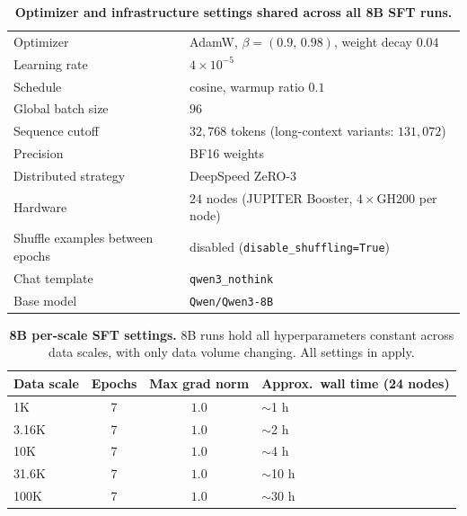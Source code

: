 \begin{table}[!htbp]
\centering
\begin{tabular}{ll}
\toprule
Optimizer                          & AdamW, $\beta = (0.9,\,0.98)$, weight decay $0.04$ \\
Learning rate                      & $4\times10^{-5}$ \\
Schedule                           & cosine, warmup ratio $0.1$ \\
Global batch size                  & $96$ \\
Sequence cutoff                    & $32{,}768$ tokens (long-context variants: $131{,}072$) \\
Precision                          & BF16 weights \\
Distributed strategy               & DeepSpeed ZeRO-3 \\
Hardware                           & $24$ nodes (JUPITER Booster, $4\times$GH200 per node) \\
Shuffle examples between epochs    & disabled (\texttt{disable\_shuffling=True}) \\
Chat template                      & \texttt{qwen3\_nothink} \\
Base model                         & \texttt{Qwen/Qwen3-8B} \\
\bottomrule
\end{tabular}
\vspace{6pt}
\caption{\textbf{Optimizer and infrastructure settings shared across all 8B SFT runs.}}
\label{tab:sft_hp_common_8b}
\end{table}



\begin{table}[!htbp]
\centering
\begin{tabular}{lccl}
\toprule
Data scale & Epochs & Max grad norm & Approx.\ wall time (24 nodes) \\
\midrule
1K    & 7 & $1.0$ & $\sim$1 h \\
3.16K & 7 & $1.0$ & $\sim$2 h \\
10K   & 7 & $1.0$ & $\sim$4 h \\
31.6K & 7 & $1.0$ & $\sim$10 h \\
100K  & 7 & $1.0$ & $\sim$30 h \\
\bottomrule
\end{tabular}
\vspace{6pt}
\caption{\textbf{8B per-scale SFT settings.} 8B runs hold all hyperparameters
constant across data scales, with only data volume changing. All settings in
 apply.}
\label{tab:sft_hp_per_scale_8b}
\end{table}
